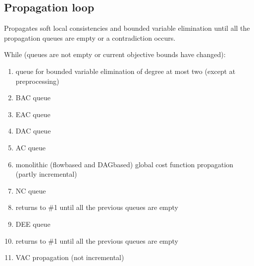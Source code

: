 \documentclass[letterpaper,10pt,openany,oneside,english]{sphinxmanual}
\begin{document}
\subsection{Propagation loop}
\label{\detokenize{ref/ref_modules:propagation-loop}}

\begin{fulllineitems}

\pysigstartsignatures
{}
\pysigstopsignatures
\sphinxAtStartPar

\sphinxAtStartPar
Propagates soft local consistencies and bounded variable elimination until all the propagation queues are empty or a contradiction occurs.

\sphinxAtStartPar
While (queues are not empty or current objective bounds have changed):
\begin{enumerate}
%
\item {} 
\sphinxAtStartPar
queue for bounded variable elimination of degree at most two (except at preprocessing)

\item {} 
\sphinxAtStartPar
BAC queue

\item {} 
\sphinxAtStartPar
EAC queue

\item {} 
\sphinxAtStartPar
DAC queue

\item {} 
\sphinxAtStartPar
AC queue

\item {} 
\sphinxAtStartPar
monolithic (flow\sphinxhyphen{}based and DAG\sphinxhyphen{}based) global cost function propagation (partly incremental)

\item {} 
\sphinxAtStartPar
NC queue

\item {} 
\sphinxAtStartPar
returns to \#1 until all the previous queues are empty

\item {} 
\sphinxAtStartPar
DEE queue

\item {} 
\sphinxAtStartPar
returns to \#1 until all the previous queues are empty

\item {} 
\sphinxAtStartPar
VAC propagation (not incremental)


\end{enumerate}
\end{fulllineitems}
\end{document}
